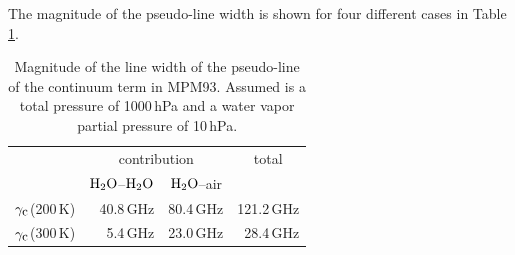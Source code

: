 %
The magnitude of the pseudo-line width is shown for four different 
cases in Table\,\ref{tab:mpm_psl_broad}. 
%
\begin{table}[!htb]
\begin{center}
\begin{tabular}{lrrr}
\hline
 & \multicolumn{2}{c}{contribution} & \multicolumn{1}{c}{total} \\
 & \multicolumn{1}{c}{$\mbox{H}_2\mbox{O}$--$\mbox{H}_2\mbox{O}$} & \multicolumn{1}{c}{$\mbox{H}_2\mbox{O}$--air} & \\
\hline
$\gamma_{\mbox{\rm \small c}}$(200\,K) & 40.8\,GHz & 80.4\,GHz & 121.2\,GHz\\
$\gamma_{\mbox{\rm \small c}}$(300\,K) &  5.4\,GHz & 23.0\,GHz &  28.4\,GHz\\
\hline
\end{tabular}
\caption[MPM93 parameters.]{Magnitude of the line width of the pseudo-line of the
  continuum term in MPM93. Assumed is a total pressure of 1000\,hPa
  and a water vapor partial pressure of 10\,hPa.}
\label{tab:mpm_psl_broad}
\end{center}
\end{table} 

